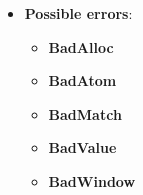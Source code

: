 \documentclass{report}
\begin{document}
\begin{itemize}
\begin{itemize}
            \end{itemize}
            \begin{itemize}
                \item \textbf{Possible errors}:
                    \begin{itemize}
                        \item \textbf{BadAlloc}
                        \item \textbf{BadAtom}
                        \item \textbf{BadMatch}
                        \item \textbf{BadValue}
                        \item \textbf{BadWindow}
                    \end{itemize}
            \end{itemize}


\end{itemize}
\end{document}
